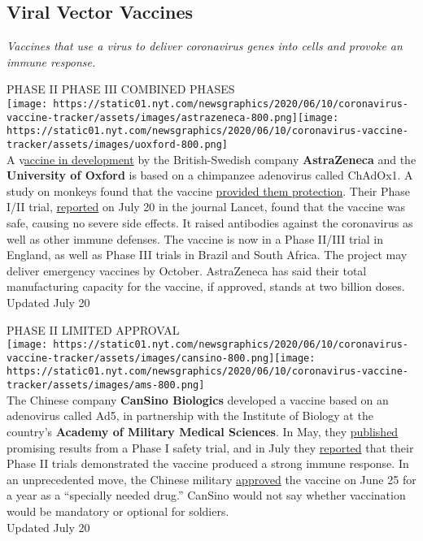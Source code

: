 \hypertarget{viral-vector-vaccines}{%
\subsection{\texorpdfstring{\textbf{Viral Vector
Vaccines}}{Viral Vector Vaccines}}\label{viral-vector-vaccines}}

\emph{Vaccines that use a virus to deliver coronavirus genes into cells
and provoke an immune response.}

PHASE II PHASE III COMBINED PHASES\\
\texttt{[image: https://static01.nyt.com/newsgraphics/2020/06/10/coronavirus-vaccine-tracker/assets/images/astrazeneca-800.png]}\texttt{[image: https://static01.nyt.com/newsgraphics/2020/06/10/coronavirus-vaccine-tracker/assets/images/uoxford-800.png]}\\
A
v\href{https://www.nytimes.com/2020/04/27/world/europe/coronavirus-vaccine-update-oxford.html}{accine
in development} by the British-Swedish company \textbf{AstraZeneca} and
the \textbf{University of Oxford} is based on a chimpanzee adenovirus
called ChAdOx1. A study on monkeys found that the vaccine
\href{https://www.nytimes.com/2020/07/30/health/covid-19-vaccine-monkeys.html}{provided
them protection}. Their Phase I/II trial,
\href{https://www.thelancet.com/lancet/article/s0140-6736(20)31604-4}{reported}
on July 20 in the journal Lancet, found that the vaccine was safe,
causing no severe side effects. It raised antibodies against the
coronavirus as well as other immune defenses. The vaccine is now in a
Phase II/III trial in England, as well as Phase III trials in Brazil and
South Africa. The project may deliver emergency vaccines by October.
AstraZeneca has said their total manufacturing capacity for the vaccine,
if approved, stands at two billion doses.\\
Updated July 20

PHASE II LIMITED APPROVAL\\
\texttt{[image: https://static01.nyt.com/newsgraphics/2020/06/10/coronavirus-vaccine-tracker/assets/images/cansino-800.png]}\texttt{[image: https://static01.nyt.com/newsgraphics/2020/06/10/coronavirus-vaccine-tracker/assets/images/ams-800.png]}\\
The Chinese company \textbf{CanSino Biologics} developed a vaccine based
on an adenovirus called Ad5, in partnership with the Institute of
Biology at the country's \textbf{Academy of Military Medical Sciences}.
In May, they
\href{https://www.nytimes.com/2020/05/22/health/coronavirus-vaccine-china.html}{published}
promising results from a Phase I safety trial, and in July they
\href{https://www.thelancet.com/lancet/article/s0140-6736(20)31605-6}{reported}
that their Phase II trials demonstrated the vaccine produced a strong
immune response. In an unprecedented move, the Chinese military
\href{https://www.nytimes.com/2020/07/16/business/china-vaccine-coronavirus.html}{approved}
the vaccine on June 25 for a year as a ``specially needed drug.''
CanSino would not say whether vaccination would be mandatory or optional
for soldiers.\\
Updated July 20


